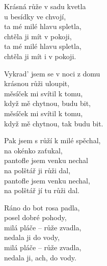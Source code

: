 
\ve{}
Krásná růže v sadu kvetla\\
u besídky ve chvojí,\\
ta mé milé hlavu spletla,\\
chtěla ji mít v pokoji,\\
ta mé milé hlavu spletla,\\
chtěla ji mít i v pokoji.

\ve{}
Vykrad’ jsem se v noci z domu\\
krásnou růži uloupit,\\
měsíček mi svítil k tomu,\\
když mě chytnou, budu bit,\\
měsíček mi svítil k tomu,\\
když mě chytnou, tak budu bit.

\ve{}
Pak jsem s růží k milé spěchal,\\
na okénko zaťukal,\\
pantofle jsem venku nechal\\
na polštář ji růži dal,\\
pantofle jsem venku nechal,\\
na polštář jí tu růži dal.

\ve{}
Ráno do bot rosa padla,\\
posel dobré pohody,\\
milá pláče -- růže zvadla,\\
nedala ji do vody,\\
milá pláče -- růže zvadla,\\
nedala ji, ach, do vody.

\esong